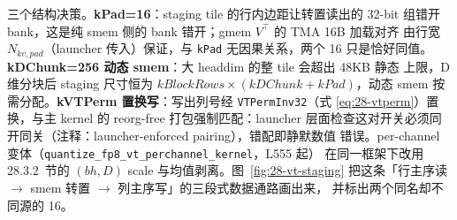 三个结构决策。\textbf{kPad=16}：staging tile 的行内边距让转置读出的 32-bit
组错开 bank，这是纯 smem 侧的 bank 错开；gmem $V^{\top}$ 的 TMA 16B 加载对齐
由行宽 $N_{kv,pad}$（launcher 传入）保证，与 \texttt{kPad} 无因果关系，两个
16 只是恰好同值。\textbf{kDChunk=256 动态 smem}：大 headdim 的整 tile 会超出 48KB 静态
上限，D 维分块后 staging 尺寸恒为 $kBlockRows\times(kDChunk+kPad)$，动态 smem
按需分配。\textbf{kVTPerm 置换写}：写出列号经 \texttt{VTPermInv32}（式
\ref{eq:28-vtperm}）置换，与主 kernel 的 reorg-free 打包强制匹配：launcher
层面检查这对开关必须同开同关（注释：launcher-enforced pairing），错配即静默数值
错误。per-channel 变体（\texttt{quantize\_fp8\_vt\_perchannel\_kernel}，L555 起）
在同一框架下改用 28.3.2~节的 $(bh, D)$ scale 与均值剥离。图~\ref{fig:28-vt-staging}
把这条「行主序读 $\to$ smem 转置 $\to$ 列主序写」的三段式数据通路画出来，
并标出两个同名却不同源的 16。

